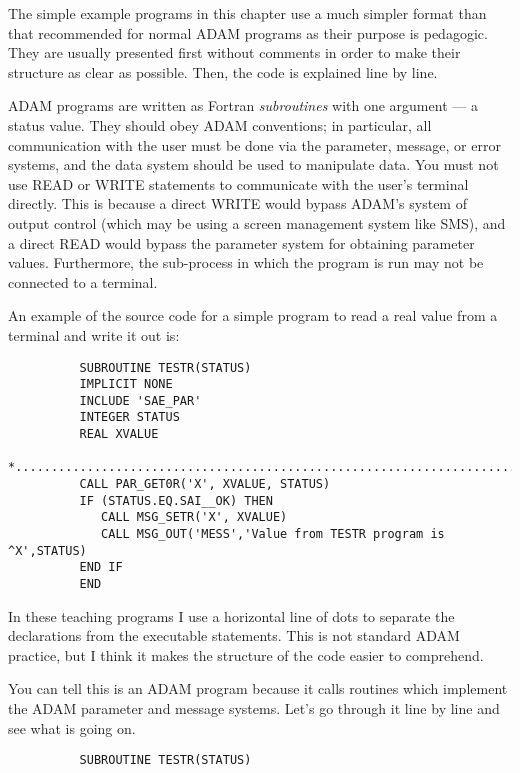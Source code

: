 The simple example programs in this chapter use a much simpler format than that
recommended for normal ADAM programs as their purpose is pedagogic.
They are usually presented first without comments in order to make their
structure as clear as possible.
Then, the code is explained line by line.

ADAM programs are written as Fortran {\em subroutines} with one argument --- a
status value.
They should obey ADAM conventions; in particular, all communication
with the user must be done via the parameter, message, or error systems, and
the data system should be used to manipulate data.
You must not use READ or WRITE statements to communicate with the user's
terminal directly.
This is because a direct WRITE would bypass ADAM's system of output control
(which may be using a screen management system like SMS), and a direct READ
would bypass the parameter system for obtaining parameter values.
Furthermore, the sub-process in which the program is run may not be connected to
a terminal.
 
An example of the source code for a simple program to read a real value from a
terminal and write it out is:

\begin{small}
\begin{verbatim}
          SUBROUTINE TESTR(STATUS)
          IMPLICIT NONE
          INCLUDE 'SAE_PAR'
          INTEGER STATUS
          REAL XVALUE
    *...........................................................................
          CALL PAR_GET0R('X', XVALUE, STATUS)
          IF (STATUS.EQ.SAI__OK) THEN
             CALL MSG_SETR('X', XVALUE)
             CALL MSG_OUT('MESS','Value from TESTR program is ^X',STATUS)
          END IF
          END
\end{verbatim}
\end{small}

In these teaching programs I use a horizontal line of dots to separate the
declarations from the executable statements.
This is not standard ADAM practice, but I think it makes the structure of the
code easier to comprehend.

You can tell this is an ADAM program because it calls routines which implement
the ADAM parameter and message systems.
Let's go through it line by line and see what is going on.

\begin{small}
\begin{verbatim}
          SUBROUTINE TESTR(STATUS)
\end{verbatim}
\end{small}


